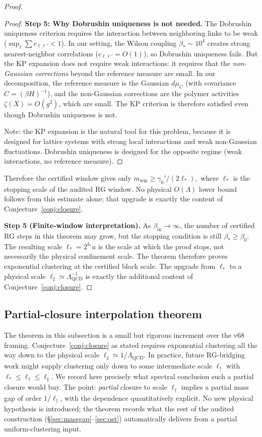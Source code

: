 \documentclass[11pt]{article}
\theoremstyle{definition}
\newcommand{\Lam}{\Lambda_{\mathrm{QCD}}}
\begin{document}
\begin{proof}
\begin{proof}
\textbf{Step 5: Why Dobrushin uniqueness is not needed.}
The Dobrushin uniqueness criterion requires the interaction
between neighboring links to be weak ($\sup_\ell\sum c_{\ell\ell'}<1$).
In our setting, the Wilson coupling $\beta_*\sim 10^4$
creates strong nearest-neighbor correlations
($c_{\ell\ell'}=O(1)$), so Dobrushin uniqueness fails.
But the KP expansion does not require weak interactions:
it requires that the \emph{non-Gaussian corrections}
beyond the reference measure are small.  In our
decomposition, the reference measure is the Gaussian
$d\mu_C$ (with covariance $C=(\beta H)^{-1}$),
and the non-Gaussian corrections are the polymer
activities $\zeta(X)=O(g^2)$, which are small.
The KP criterion is therefore satisfied even though
Dobrushin uniqueness is not.

Note: the KP expansion
is the natural tool for this problem, because
it is designed for lattice systems with strong local
interactions and weak non-Gaussian fluctuations.
Dobrushin uniqueness is designed for the opposite regime
(weak interactions, no reference measure).
\end{proof}

Therefore the certified window gives only
$
 m_{\mathrm{win}}\ge\gamma_0'/(2\ell_*),
$
where $\ell_*$ is the stopping scale of the audited RG window.
No physical $O(\Lambda)$ lower bound follows from this estimate alone;
that upgrade is exactly the content of Conjecture~\ref{conj:closure}.

\medskip\noindent\textbf{Step 5 (Finite-window interpretation).}
As $\beta_{\mathrm{in}}\to\infty$, the number of certified RG steps in
this theorem may grow, but the stopping condition is still
$\beta_*\ge\beta_0$.  The resulting scale
$\ell_*=2^{k_*}a$ is the scale at which the proof stops, not
necessarily the physical confinement scale.  The theorem therefore
proves exponential clustering at the certified block scale.  The
upgrade from $\ell_*$ to a physical scale $\ell_\sharp\simeq\Lam^{-1}$
is exactly the additional content of Conjecture~\ref{conj:closure}.
\end{proof}

\subsection{Partial-closure interpolation theorem}\label{subsec:interp}

The theorem in this subsection is a small but rigorous increment over
the v68 framing.  Conjecture~\ref{conj:closure} as stated requires
exponential clustering all the way down to the physical scale
$\ell_\sharp\simeq 1/\Lam$.  In practice, future RG-bridging work
might supply clustering only down to some intermediate scale
$\ell_\dagger$ with $\ell_*\le \ell_\dagger\le\ell_\sharp$.  We
record here precisely what spectral conclusion such a partial closure
would buy.  The point: \emph{partial} closure to scale $\ell_\dagger$
implies a partial mass gap of order $1/\ell_\dagger$, with the
dependence quantitatively explicit.  No new physical hypothesis is
introduced; the theorem records what the rest of the audited
construction (\S\ref{sec:massgap}--\ref{sec:ost}) automatically
delivers from a partial uniform-clustering input.
\end{document}
